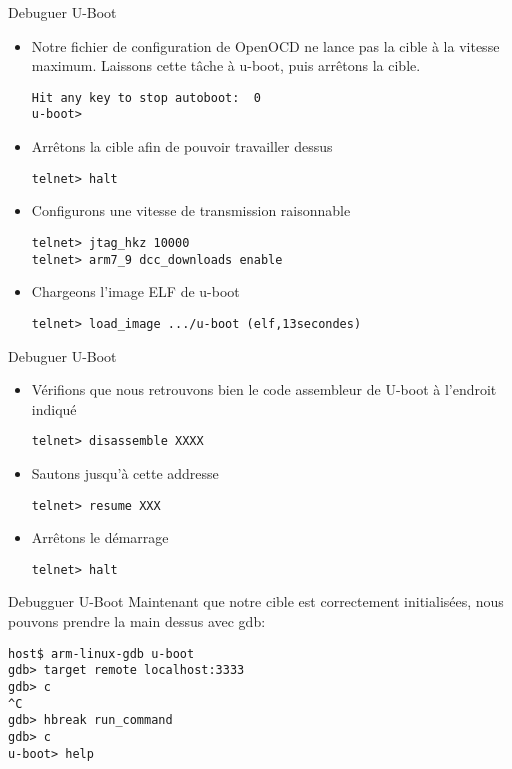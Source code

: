 \begin{frame}[fragile=singleslide]{Debuguer U-Boot}
  \begin{itemize} 
  \item  Notre fichier  de configuration  de OpenOCD  ne lance  pas la
    cible à la  vitesse maximum.  Laissons cette tâche  à u-boot, puis
    arrêtons la cible.
    \begin{lstlisting} 
Hit any key to stop autoboot:  0 
u-boot> 
    \end{lstlisting} 
  \item Arrêtons la cible afin de pouvoir travailler dessus
    \begin{lstlisting} 
telnet> halt
    \end{lstlisting} 
  \item Configurons une vitesse de transmission raisonnable
    \begin{lstlisting} 
telnet> jtag_hkz 10000
telnet> arm7_9 dcc_downloads enable
    \end{lstlisting} 
  \item Chargeons l'image ELF de u-boot
    \begin{lstlisting} 
telnet> load_image .../u-boot (elf,13secondes)
    \end{lstlisting} 
  \end{itemize}
\end{frame}

\begin{frame}[fragile=singleslide]{Debuguer U-Boot}
  \begin{itemize} 
  \item Vérifions que nous retrouvons bien le code assembleur de U-boot à l'endroit indiqué
    \begin{lstlisting} 
telnet> disassemble XXXX
    \end{lstlisting} 
  \item Sautons jusqu'à cette addresse
    \begin{lstlisting} 
telnet> resume XXX
    \end{lstlisting} 
  \item Arrêtons le démarrage
    \begin{lstlisting} 
telnet> halt
    \end{lstlisting} 
  \end{itemize}
\end{frame}

\begin{frame}[fragile=singleslide]{Debugguer U-Boot}
  Maintenant que notre cible est correctement initialisées, nous pouvons prendre la main dessus avec gdb:
  \begin{lstlisting}
host$ arm-linux-gdb u-boot
gdb> target remote localhost:3333
gdb> c
^C
gdb> hbreak run_command
gdb> c
u-boot> help
\end{lstlisting} 
\end{frame}

